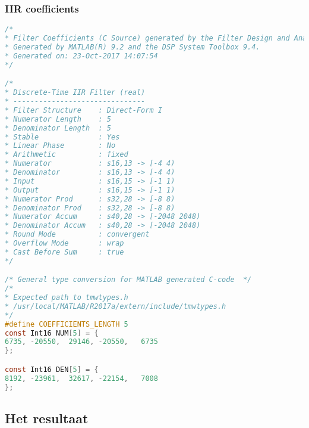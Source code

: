 \subsubsection{IIR coefficients}
\begin{lstlisting}[language=c]
/*
* Filter Coefficients (C Source) generated by the Filter Design and Analysis Tool
* Generated by MATLAB(R) 9.2 and the DSP System Toolbox 9.4.
* Generated on: 23-Oct-2017 14:07:54
*/

/*
* Discrete-Time IIR Filter (real)
* -------------------------------
* Filter Structure    : Direct-Form I
* Numerator Length    : 5
* Denominator Length  : 5
* Stable              : Yes
* Linear Phase        : No
* Arithmetic          : fixed
* Numerator           : s16,13 -> [-4 4)
* Denominator         : s16,13 -> [-4 4)
* Input               : s16,15 -> [-1 1)
* Output              : s16,15 -> [-1 1)
* Numerator Prod      : s32,28 -> [-8 8)
* Denominator Prod    : s32,28 -> [-8 8)
* Numerator Accum     : s40,28 -> [-2048 2048)
* Denominator Accum   : s40,28 -> [-2048 2048)
* Round Mode          : convergent
* Overflow Mode       : wrap
* Cast Before Sum     : true
*/

/* General type conversion for MATLAB generated C-code  */
/* 
* Expected path to tmwtypes.h 
* /usr/local/MATLAB/R2017a/extern/include/tmwtypes.h 
*/
#define COEFFICIENTS_LENGTH 5
const Int16 NUM[5] = {
6735, -20550,  29146, -20550,   6735
};

const Int16 DEN[5] = {
8192, -23961,  32617, -22154,   7008
};	   
\end{lstlisting}
\clearpage

\subsection{Het resultaat}	
\clearpage